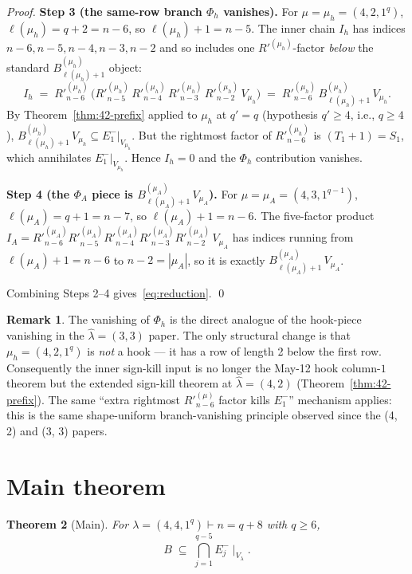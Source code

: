 \documentclass[11pt]{article}
\newtheorem{theorem}{Theorem}
\theoremstyle{definition}
\newtheorem{remark}[theorem]{Remark}
\newcommand{\hatl}{\widehat\lambda}
\newcommand{\Rp}{{R'}}
\begin{document}
\begin{proof}
\medskip\textbf{Step 3 (the same-row branch $\Phi_h$ vanishes).}
For $\mu = \mu_h = (4, 2, 1^q)$, $\ell(\mu_h) = q + 2 = n - 6$,
so $\ell(\mu_h) + 1 = n - 5$.  The inner chain $I_h$ has indices
$n-6, n-5, n-4, n-3, n-2$ and so includes one $\Rp^{(\mu_h)}$-factor
\emph{below} the standard $B^{(\mu_h)}_{\ell(\mu_h)+1}$ object:
\[
   I_h \;=\; \Rp^{(\mu_h)}_{n-6}\,\bigl(\Rp^{(\mu_h)}_{n-5}\,
   \Rp^{(\mu_h)}_{n-4}\,\Rp^{(\mu_h)}_{n-3}\,\Rp^{(\mu_h)}_{n-2}\,V_{\mu_h}\bigr)
   \;=\; \Rp^{(\mu_h)}_{n-6}\,B^{(\mu_h)}_{\ell(\mu_h)+1}\,V_{\mu_h}.
\]
By Theorem~\ref{thm:42-prefix} applied to $\mu_h$ at $q' = q$
(hypothesis $q' \ge 4$, i.e., $q \ge 4$),
$B^{(\mu_h)}_{\ell(\mu_h)+1}\,V_{\mu_h} \subseteq E_1^-|_{V_{\mu_h}}$.
But the rightmost factor of $\Rp^{(\mu_h)}_{n-6}$ is $(T_1+1) = S_1$,
which annihilates $E_1^-|_{V_{\mu_h}}$.  Hence $I_h = 0$ and the
$\Phi_h$ contribution vanishes.

\medskip\textbf{Step 4 (the $\Phi_A$ piece is $B^{(\mu_A)}_{\ell(\mu_A)+1}\,V_{\mu_A}$).}
For $\mu = \mu_A = (4, 3, 1^{q-1})$, $\ell(\mu_A) = q + 1 = n - 7$,
so $\ell(\mu_A) + 1 = n - 6$.  The five-factor product
$I_A = \Rp^{(\mu_A)}_{n-6} \Rp^{(\mu_A)}_{n-5}\Rp^{(\mu_A)}_{n-4}
\Rp^{(\mu_A)}_{n-3}\Rp^{(\mu_A)}_{n-2}\,V_{\mu_A}$ has indices
running from $\ell(\mu_A)+1 = n-6$ to $n-2 = |\mu_A|$, so it is
exactly $B^{(\mu_A)}_{\ell(\mu_A)+1}\,V_{\mu_A}$.

Combining Steps 2--4 gives~\eqref{eq:reduction}.
\qed
\end{proof}

\begin{remark}\label{rem:vanishing-mechanism}
The vanishing of $\Phi_h$ is the direct analogue of the hook-piece
vanishing in the $\hatl = (3, 3)$ paper.  The only structural change
is that $\mu_h = (4, 2, 1^q)$ is \emph{not} a hook --- it has a row
of length 2 below the first row.  Consequently the inner sign-kill
input is no longer the May-12 hook column-$1$ theorem but the
extended sign-kill theorem at $\hatl = (4, 2)$ (Theorem~\ref{thm:42-prefix}).
The same ``extra rightmost $\Rp^{(\mu)}_{n-6}$ factor kills $E_1^-$'' mechanism
applies: this is the same shape-uniform branch-vanishing principle observed
since the (4, 2) and (3, 3) papers.
\end{remark}

\section{Main theorem}\label{sec:main}

\begin{theorem}[Main]\label{thm:main}
For $\lambda = (4, 4, 1^q) \vdash n = q + 8$ with $q \ge 6$,
\[
   B \;\subseteq\; \bigcap_{j=1}^{q-5} E_j^-\!\mid_{V_\lambda}.
\]
\end{theorem}
\end{document}
